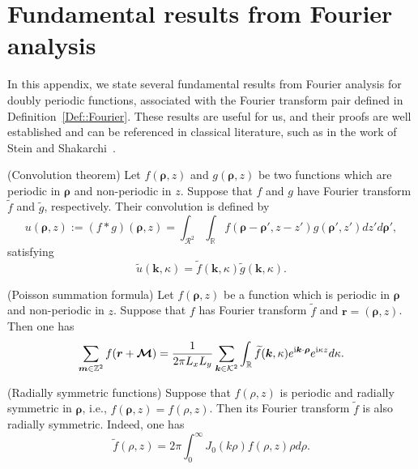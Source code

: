 \section{Fundamental results from Fourier analysis} \label{app::Fourier}
In this appendix, we state several fundamental results from Fourier analysis for doubly periodic functions, associated with the Fourier transform pair defined in Definition~\ref{Def::Fourier}. These results are useful for us, and their proofs are well established and can be referenced in classical literature, such as in the work of Stein and Shakarchi~\cite{stein2011fourier}.
\begin{lem}\label{lem::Convolution}
	(Convolution theorem) Let $f(\bm{\rho},z)$ and $g(\bm{\rho},z)$ be two functions which are periodic in $\bm{\rho}$ and non-periodic in $z$. Suppose that $f$ and $g$ have Fourier transform $\widetilde{f}$ and $\widetilde{g}$, respectively. Their convolution is defined by
	\begin{equation}\label{eq:Q2D_cov}
		u(\bm{\rho},z):=(f\ast g)(\bm{\rho},z)=\int_{\mathcal{R}^2}\int_{\mathbb{R}}f(\bm{\rho}-\bm{\rho}',z-z')g(\bm{\rho}',z')dz'd\bm{\rho}',
	\end{equation}
	satisfying
	\begin{equation}
		\widetilde{u}(\bm{k},\kappa)=\widetilde{f}(\bm{k},\kappa)\widetilde{g}(\bm{k},\kappa).
	\end{equation}
	
\end{lem}
\begin{lem}\label{lem::Poisson}
	(Poisson summation formula) Let $f(\bm{\rho},z)$ be a function which is periodic in $\bm{\rho}$ and non-periodic in $z$. Suppose that $f$ has Fourier transform $\widetilde{f}$ and $\bm{r}=(\bm{\rho},z)$. Then one has
	\begin{equation}
		\sum_{\bm{m}\in \mathbb{Z}^2} f(\bm{r} + \boldsymbol{\mathcal{M}}) = \frac{1}{2\pi L_x L_y}\sum_{\bm{k}\in \mathcal{K}^2}\int_{\mathbb{R}}\widetilde{f}(\bm{k},\kappa)e^{\mathrm{i} \bm{k}\cdot\bm{\rho}}e^{\mathrm{i} \kappa z}d\kappa.
	\end{equation}
\end{lem}
\begin{lem}\label{lem::2dfourier}
	(Radially symmetric functions) 
	Suppose that $f(\rho,z)$ is periodic and radially symmetric in $\bm{\rho}$, i.e., $f(\bm{\rho},z)=f(\rho,z)$. Then its Fourier transform $\widetilde{f}$ is also radially symmetric. Indeed, one has
	\begin{equation}
		\widetilde{f}(\rho,z)=2\pi\int_{0}^{\infty}J_0(k\rho)f(\rho,z)\rho d\rho.
	\end{equation}
\end{lem}


